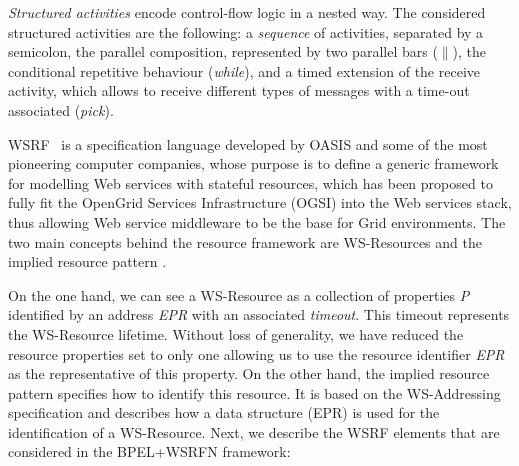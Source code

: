\emph{Structured activities} encode control-flow logic in a nested
way. The considered structured activities are the following:
a {\em sequence} of activities, separated by a semicolon, 
the parallel composition, represented by two parallel bars ($\|$),
the conditional repetitive behaviour ({\em while}),
and a timed extension of the receive activity, which allows to
receive different types of messages with a time-out associated
({\em pick}).

WSRF~\cite{Banks2006} is a specification language 
developed by OASIS and some of the most pioneering computer companies, 
whose purpose is to define a generic framework for modelling Web services 
with stateful resources, which has been proposed to 
fully fit the OpenGrid Services
Infrastructure (OGSI) into the Web services stack, thus allowing Web service middleware to
be the base for Grid environments. The two main concepts behind the resource framework are 
WS-Resources and the implied resource pattern \cite{Leymann:2006}.


On the one hand, we can see a WS-Resource as a collection of properties \emph{P} identified by an address \emph{EPR} with an associated \emph{timeout}. This timeout represents the WS-Resource lifetime. Without loss of generality, we have reduced the resource properties set to only one allowing us to use the resource identifier \emph{EPR} as the representative of this property. On the other hand, the implied resource pattern specifies how to identify this resource.
It is based on the WS-Addressing~\cite{wsaddressing} specification and describes how a data
structure (EPR) is used for the identification of a WS-Resource.
Next, we describe the WSRF elements
that are considered in the BPEL+WSRFN framework:

\vspace*{-0.15cm}


